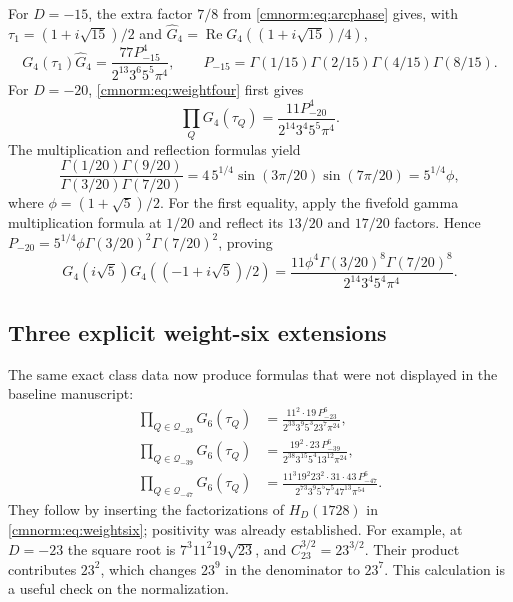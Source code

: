 For $D=-15$, the extra factor $7/8$ from
\eqref{cmnorm:eq:arcphase} gives, with
$\tau_1=(1+i\sqrt{15})/2$ and
$\widehat G_4=\operatorname{Re}G_4((1+i\sqrt{15})/4)$,
\begin{equation}
 G_4(\tau_1)\widehat G_4
 =\frac{77P_{-15}^4}{2^{13}3^6 5^5\pi^4},\qquad
 P_{-15}=\Gamma(1/15)\Gamma(2/15)\Gamma(4/15)\Gamma(8/15).
 \label{cmnorm:eq:G4d15}
\end{equation}
For $D=-20$, \eqref{cmnorm:eq:weightfour} first gives
\[
 \prod_QG_4(\tau_Q)=\frac{11P_{-20}^4}{2^{14}3^4 5^5\pi^4}.
\]
The multiplication and reflection formulas yield
\[
 \frac{\Gamma(1/20)\Gamma(9/20)}
      {\Gamma(3/20)\Gamma(7/20)}
 =4\,5^{1/4}\sin(3\pi/20)\sin(7\pi/20)
 =5^{1/4}\phi,
\]
where $\phi=(1+\sqrt5)/2$. For the first equality, apply the
fivefold gamma multiplication formula at $1/20$ and reflect its
$13/20$ and $17/20$ factors. Hence
$P_{-20}=5^{1/4}\phi\Gamma(3/20)^2\Gamma(7/20)^2$, proving
\begin{equation}
 G_4(i\sqrt5)G_4((-1+i\sqrt5)/2)
 =\frac{11\phi^4\Gamma(3/20)^8\Gamma(7/20)^8}
        {2^{14}3^4 5^4\pi^4}.
 \label{cmnorm:eq:G4d20}
\end{equation}

\subsection{Three explicit weight-six extensions}

The same exact class data now produce formulas that were not displayed
in the baseline manuscript:
\begin{align}
 \prod_{Q\in\mathcal Q_{-23}}G_6(\tau_Q)
 &=\frac{11^2\cdot19\,P_{-23}^6}
       {2^{33}3^9 5^3 23^7\pi^{24}},\label{cmnorm:eq:G6d23}\\
 \prod_{Q\in\mathcal Q_{-39}}G_6(\tau_Q)
 &=\frac{19^2\cdot23\,P_{-39}^6}
       {2^{38}3^{15}5^4 13^{12}\pi^{24}},\label{cmnorm:eq:G6d39}\\
 \prod_{Q\in\mathcal Q_{-47}}G_6(\tau_Q)
 &=\frac{11^3 19^2 23^2\cdot31\cdot43\,P_{-47}^6}
       {2^{73}3^9 5^5 7^5 47^{13}\pi^{54}}.
       \label{cmnorm:eq:G6d47}
\end{align}
They follow by inserting the factorizations of $H_D(1728)$ in
\eqref{cmnorm:eq:weightsix}; positivity was already established.
For example, at $D=-23$ the square root is
$7^3 11^2 19\sqrt{23}$, and $C_{23}^{3/2}=23^{3/2}$.
Their product contributes $23^2$, which changes $23^9$ in the
denominator to $23^7$. This calculation is a useful check on the
normalization.

